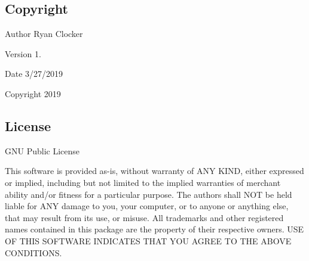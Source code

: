 \hypertarget{index_copyright}{}\subsection{Copyright}\label{index_copyright}
\begin{DoxyAuthor}{Author}
Ryan Clocker 
\end{DoxyAuthor}
\begin{DoxyVersion}{Version}
1. 
\end{DoxyVersion}
\begin{DoxyDate}{Date}
3/27/2019 
\end{DoxyDate}
\begin{DoxyCopyright}{Copyright}
2019
\end{DoxyCopyright}


\hypertarget{index_license}{}\subsection{License}\label{index_license}
G\+NU Public License

This software is provided as-\/is, without warranty of A\+NY K\+I\+ND, either expressed or implied, including but not limited to the implied warranties of merchant ability and/or fitness for a particular purpose. The authors shall N\+OT be held liable for A\+NY damage to you, your computer, or to anyone or anything else, that may result from its use, or misuse. All trademarks and other registered names contained in this package are the property of their respective owners. U\+SE OF T\+H\+IS S\+O\+F\+T\+W\+A\+RE I\+N\+D\+I\+C\+A\+T\+ES T\+H\+AT Y\+OU A\+G\+R\+EE TO T\+HE A\+B\+O\+VE C\+O\+N\+D\+I\+T\+I\+O\+NS. 